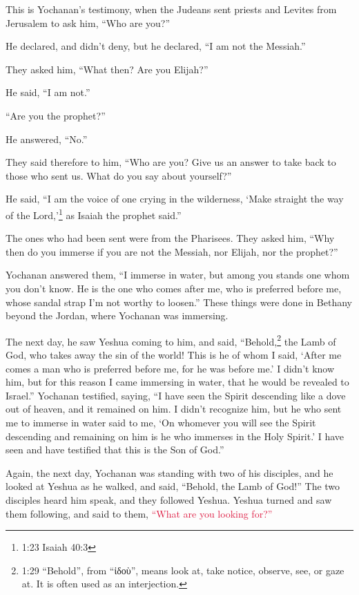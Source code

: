 \myverse{}This is Yochanan’s testimony, when the Judeans sent priests and
Levites from Jerusalem to ask him, “Who are you?”

\myverse{}He declared, and didn’t deny, but he declared, “I am not the
Messiah.”

\myverse{}They asked him, “What then? Are you Elijah?”

He said, “I am not.”

“Are you the prophet?”

He answered, “No.”

\myverse{}They said therefore to him, “Who are you? Give us an answer to
take back to those who sent us. What do you say about yourself?”

\myverse{}He said, “I am the voice of one crying in the wilderness, ‘Make
straight the way of the Lord,’\footnote{1:23 Isaiah 40:3} as Isaiah the prophet said.”

\myverse{}The ones who had been sent were from the Pharisees.
\myverse{}They asked him, “Why then do you immerse if you are not the Messiah, nor Elijah,
nor the prophet?”

\myverse{}Yochanan answered them, “I immerse in water, but among you stands
one whom you don’t know.
\myverse{}He is the one who comes after me, who is preferred before me, whose sandal
strap I’m not worthy to loosen.”
\myverse{}These things were done in Bethany beyond the Jordan, where Yochanan was immersing.

\myverse{}The next day, he saw Yeshua coming to him, and said, “Behold,\footnote{1:29 “Behold”, from “ἰδοὺ”, means look at, take notice, observe, see, or gaze at. It is often used
	as an interjection.} the Lamb of God, who takes away the sin of the world!
\myverse{}This is he of whom I said, ‘After me comes a man who is preferred before me,
for he was before me.’
\myverse{}I didn’t know him, but for this reason I came immersing in water, that he
would be revealed to Israel.”
\myverse{}Yochanan testified, saying, “I have seen the Spirit descending like a dove
out of heaven, and it remained on him.
\myverse{}I didn’t recognize him, but he who sent me to immerse in water said to me,
‘On whomever you will see the Spirit descending and remaining on him is he who immerses in the Holy Spirit.’
\myverse{}I have seen and have testified that this is the Son of God.”

\myverse{}Again, the next day, Yochanan was standing with two of his disciples,
\myverse{}and he looked at Yeshua as he walked, and said, “Behold, the Lamb of God!”
\myverse{}The two disciples heard him speak, and they followed Yeshua.
\myverse{}Yeshua turned and saw them following, and said to them,
\textcolor{crimson}{“What are you looking for?”}

